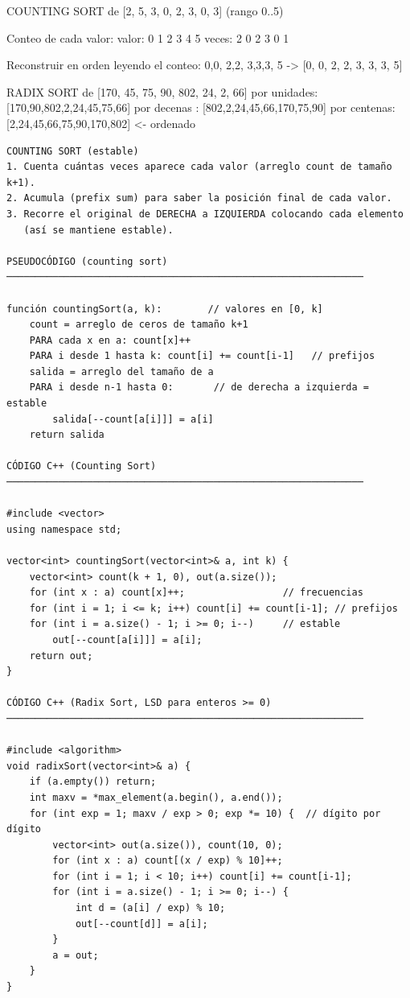 \begin{dsadiagrama}
COUNTING SORT de [2, 5, 3, 0, 2, 3, 0, 3]  (rango 0..5)

Conteo de cada valor:
  valor:  0  1  2  3  4  5
  veces:  2  0  2  3  0  1

Reconstruir en orden leyendo el conteo:
  0,0, 2,2, 3,3,3, 5  ->  [0, 0, 2, 2, 3, 3, 3, 5]

RADIX SORT de [170, 45, 75, 90, 802, 24, 2, 66]
  por unidades:  [170,90,802,2,24,45,75,66]
  por decenas :  [802,2,24,45,66,170,75,90]
  por centenas:  [2,24,45,66,75,90,170,802]  <- ordenado
\end{dsadiagrama}

\begin{lstlisting}
COUNTING SORT (estable)
1. Cuenta cuántas veces aparece cada valor (arreglo count de tamaño k+1).
2. Acumula (prefix sum) para saber la posición final de cada valor.
3. Recorre el original de DERECHA a IZQUIERDA colocando cada elemento
   (así se mantiene estable).

PSEUDOCÓDIGO (counting sort)
──────────────────────────────────────────────────────────────

función countingSort(a, k):        // valores en [0, k]
    count = arreglo de ceros de tamaño k+1
    PARA cada x en a: count[x]++
    PARA i desde 1 hasta k: count[i] += count[i-1]   // prefijos
    salida = arreglo del tamaño de a
    PARA i desde n-1 hasta 0:       // de derecha a izquierda = estable
        salida[--count[a[i]]] = a[i]
    return salida

CÓDIGO C++ (Counting Sort)
──────────────────────────────────────────────────────────────

#include <vector>
using namespace std;

vector<int> countingSort(vector<int>& a, int k) {
    vector<int> count(k + 1, 0), out(a.size());
    for (int x : a) count[x]++;                 // frecuencias
    for (int i = 1; i <= k; i++) count[i] += count[i-1]; // prefijos
    for (int i = a.size() - 1; i >= 0; i--)     // estable
        out[--count[a[i]]] = a[i];
    return out;
}

CÓDIGO C++ (Radix Sort, LSD para enteros >= 0)
──────────────────────────────────────────────────────────────

#include <algorithm>
void radixSort(vector<int>& a) {
    if (a.empty()) return;
    int maxv = *max_element(a.begin(), a.end());
    for (int exp = 1; maxv / exp > 0; exp *= 10) {  // dígito por dígito
        vector<int> out(a.size()), count(10, 0);
        for (int x : a) count[(x / exp) % 10]++;
        for (int i = 1; i < 10; i++) count[i] += count[i-1];
        for (int i = a.size() - 1; i >= 0; i--) {
            int d = (a[i] / exp) % 10;
            out[--count[d]] = a[i];
        }
        a = out;
    }
}


\end{lstlisting}
